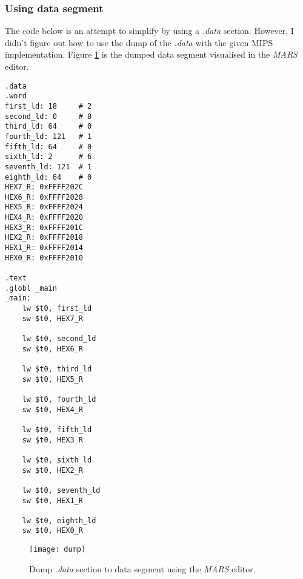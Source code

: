 \newpage
\subsubsection{Using data segment}

The code below is an attempt to simplify by using a \textit{.data} section. However, I didn't figure out how to use the dump of the \textit{.data} with the given MIPS implementation. Figure \ref{fig:dump} is the dumped data segment visualised in the \textit{MARS} editor.

\begin{verbatim}
.data
.word
first_ld: 18     # 2
second_ld: 0     # 8
third_ld: 64     # 0
fourth_ld: 121   # 1
fifth_ld: 64     # 0
sixth_ld: 2      # 6
seventh_ld: 121  # 1
eighth_ld: 64    # 0
HEX7_R: 0xFFFF202C
HEX6_R: 0xFFFF2028
HEX5_R: 0xFFFF2024
HEX4_R: 0xFFFF2020
HEX3_R: 0xFFFF201C
HEX2_R: 0xFFFF2018
HEX1_R: 0xFFFF2014
HEX0_R: 0xFFFF2010

.text
.globl _main
_main:
	lw $t0, first_ld
	sw $t0, HEX7_R

	lw $t0, second_ld
	sw $t0, HEX6_R

	lw $t0, third_ld
	sw $t0, HEX5_R

	lw $t0, fourth_ld
	sw $t0, HEX4_R

	lw $t0, fifth_ld
	sw $t0, HEX3_R

	lw $t0, sixth_ld
	sw $t0, HEX2_R

	lw $t0, seventh_ld
	sw $t0, HEX1_R

	lw $t0, eighth_ld
	sw $t0, HEX0_R
\end{verbatim}

\begin{figure}[htbp]
   \centering
   \texttt{[image: dump]}
   \caption{Dump \textit{.data} section to data segment using the \textit{MARS} editor.}
   \label{fig:dump}
\end{figure}
